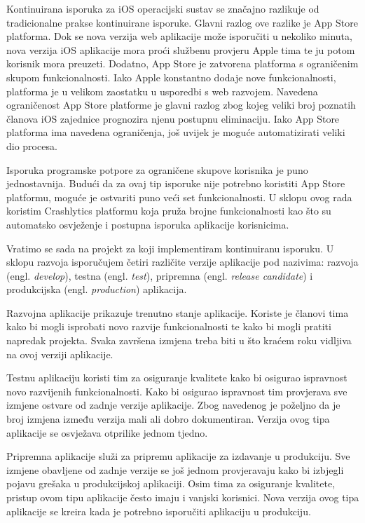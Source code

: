 \documentclass[times, utf8, diplomski, numeric]{fer}
\newcommand{\eng}[1]{(engl. \textit{#1})}
\begin{document}
Kontinuirana isporuka za iOS operacijski sustav se značajno razlikuje od tradicionalne prakse kontinuirane isporuke. Glavni razlog ove razlike je App Store platforma. Dok se nova verzija web aplikacije može isporučiti u nekoliko minuta, nova verzija iOS aplikacije mora proći službenu provjeru Apple tima te ju potom korisnik mora preuzeti. Dodatno, App Store je zatvorena platforma s ograničenim skupom funkcionalnosti. Iako Apple konstantno dodaje nove funkcionalnosti, platforma je u velikom zaostatku u usporedbi s web razvojem. Navedena ograničenost App Store platforme je glavni razlog zbog kojeg veliki broj poznatih članova iOS zajednice prognozira njenu postupnu eliminaciju. Iako App Store platforma ima navedena ograničenja, još uvijek je moguće automatizirati veliki dio procesa.

Isporuka programske potpore za ograničene skupove korisnika je puno jednostavnija. Budući da za ovaj tip isporuke nije potrebno koristiti App Store platformu, moguće je ostvariti puno veći set funkcionalnosti. U sklopu ovog rada koristim Crashlytics platformu koja pruža brojne funkcionalnosti kao što su automatsko osvježenje i postupna isporuka aplikacije korisnicima.

Vratimo se sada na projekt za koji implementiram kontinuiranu isporuku. U sklopu razvoja isporučujem četiri različite verzije aplikacije pod nazivima: razvoja \eng{develop}, testna \eng{test}, pripremna \eng{release candidate} i produkcijska \eng{production} aplikacija.

Razvojna aplikacije prikazuje trenutno stanje aplikacije. Koriste je članovi tima kako bi mogli isprobati novo razvije funkcionalnosti te kako bi mogli pratiti napredak projekta. Svaka završena izmjena treba biti u što kraćem roku vidljiva na ovoj verziji aplikacije.

Testnu aplikaciju koristi tim za osiguranje kvalitete kako bi osigurao ispravnost novo razvijenih funkcionalnosti. Kako bi osigurao ispravnost tim provjerava sve izmjene ostvare od zadnje verzije aplikacije. Zbog navedenog je poželjno da je broj izmjena između verzija mali ali dobro dokumentiran. Verzija ovog tipa aplikacije se osvježava otprilike jednom tjedno.

Pripremna aplikacije služi za pripremu aplikacije za izdavanje u produkciju. Sve izmjene obavljene od zadnje verzije se još jednom provjeravaju kako bi izbjegli pojavu grešaka u produkcijskoj aplikaciji. Osim tima za osiguranje kvalitete, pristup ovom tipu aplikacije često imaju i vanjski korisnici. Nova verzija ovog tipa aplikacije se kreira kada je potrebno isporučiti aplikaciju u produkciju.
\end{document}
